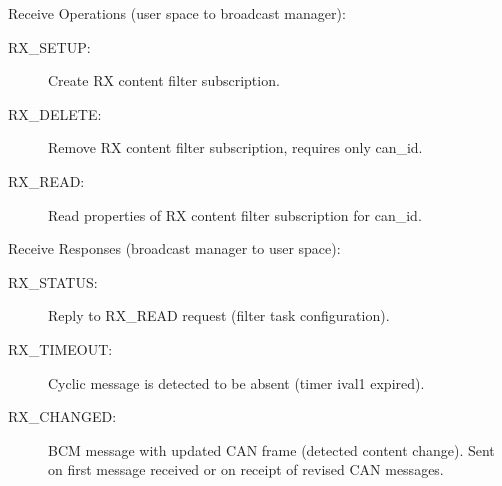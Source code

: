 \documentclass[a4paper,8pt,english]{sphinxmanual}
\begin{document}
Receive Operations (user space to broadcast manager):
\begin{description}
\item[{RX\_SETUP:}] \leavevmode
Create RX content filter subscription.

\item[{RX\_DELETE:}] \leavevmode
Remove RX content filter subscription, requires only can\_id.

\item[{RX\_READ:}] \leavevmode
Read properties of RX content filter subscription for can\_id.

\end{description}

Receive Responses (broadcast manager to user space):
\begin{description}
\item[{RX\_STATUS:}] \leavevmode
Reply to RX\_READ request (filter task configuration).

\item[{RX\_TIMEOUT:}] \leavevmode
Cyclic message is detected to be absent (timer ival1 expired).

\item[{RX\_CHANGED:}] \leavevmode
BCM message with updated CAN frame (detected content change).
Sent on first message received or on receipt of revised CAN messages.

\end{description}
\end{document}
